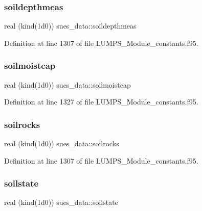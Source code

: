 \mbox{\label{namespacesues__data_ac09e3f2b843f21d26f4f106cb450df06}} 
\subsubsection{\texorpdfstring{soildepthmeas}{soildepthmeas}}
{\footnotesize\ttfamily real (kind(1d0)) sues\+\_\+data\+::soildepthmeas}



Definition at line 1307 of file L\+U\+M\+P\+S\+\_\+\+Module\+\_\+constants.\+f95.

\mbox{\label{namespacesues__data_ada5a214d0c4d5da587baa5f8de1da6d9}} 
\subsubsection{\texorpdfstring{soilmoistcap}{soilmoistcap}}
{\footnotesize\ttfamily real (kind(1d0)) sues\+\_\+data\+::soilmoistcap}



Definition at line 1327 of file L\+U\+M\+P\+S\+\_\+\+Module\+\_\+constants.\+f95.

\mbox{\label{namespacesues__data_a5eb41bdf4cc30812b303de4d2acceb67}} 
\subsubsection{\texorpdfstring{soilrocks}{soilrocks}}
{\footnotesize\ttfamily real (kind(1d0)) sues\+\_\+data\+::soilrocks}



Definition at line 1307 of file L\+U\+M\+P\+S\+\_\+\+Module\+\_\+constants.\+f95.

\mbox{\label{namespacesues__data_afa546047f4e8bd032736a6915fe1cffd}} 
\subsubsection{\texorpdfstring{soilstate}{soilstate}}
{\footnotesize\ttfamily real (kind(1d0)) sues\+\_\+data\+::soilstate}



